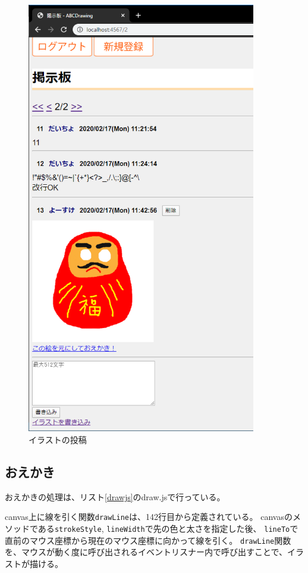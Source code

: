 \documentclass[a4j,titlepage]{jsarticle}
\begin{document}
\begin{figure}[H]
  \centering
  \includegraphics[width=10cm]{drawpost.png}
  \caption{イラストの投稿}
  \label{drawpost}
\end{figure}

\subsection{おえかき}
おえかきの処理は、リスト\ref{drawjs}のdraw.jsで行っている。

canvas上に線を引く関数\texttt{drawLine}は、142行目から定義されている。
canvasのメソッドである\texttt{strokeStyle}, \texttt{lineWidth}で先の色と太さを指定した後、
\texttt{lineTo}で直前のマウス座標から現在のマウス座標に向かって線を引く。
\texttt{drawLine}関数を、マウスが動く度に呼び出されるイベントリスナー内で呼び出すことで、イラストが描ける。
\end{document}
